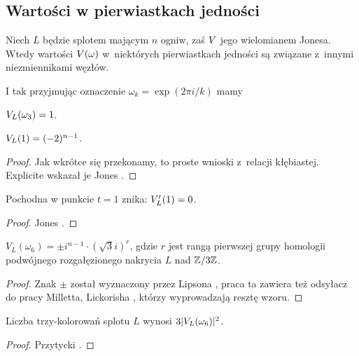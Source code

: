 
\subsection{Wartości w pierwiastkach jedności}
Niech $L$ będzie splotem mającym $n$ ogniw, zaś $V$ jego wielomianem Jonesa.
Wtedy wartości $V(\omega)$ w~niektórych pierwiastkach jedności są związane z~innymi niezmiennikami węzłów.

I tak przyjmując oznaczenie $\omega_k = \exp(2\pi i/k)$ mamy

\begin{proposition}
    \label{prp:jones_at_roots_of_unity}
    $V_L(\omega_3) = 1$.
\end{proposition}

\begin{proposition}
    $V_L(1) = (-2)^{n-1}$.
\end{proposition}

\begin{proof}
%
    Jak wkrótce się przekonamy, to proste wnioski z~relacji kłębiastej.
    Explicite wskazał je Jones \cite[twierdzenie 14, 15]{jones1985}.
\end{proof}

\begin{proposition}
    Pochodna w punkcie $t = 1$ znika: $V'_L(1) = 0$.
\end{proposition}

\begin{proof}
    Jones \cite[twierdzenie 16]{jones1985}.
\end{proof}

\begin{proposition}
    $V_L(\omega_6) = \pm i^{n-1} \cdot (\sqrt 3i)^r$, gdzie $r$ jest rangą pierwszej grupy homologii podwójnego rozgałęzionego nakrycia $L$ nad $\mathbb Z/3\mathbb Z$.
\end{proposition}

\begin{proof}
%
    Znak $\pm$ został wyznaczony przez Lipsona \cite{lipson1986}, praca ta zawiera też odsyłacz do pracy Milletta, Lickorisha \cite{lickorish1986}, którzy wyprowadzają resztę wzoru.
\end{proof}

\begin{proposition}
    Liczba trzy-kolorowań splotu $L$ wynosi $3|V_L(\omega_6)|^2$.
\end{proposition}

\begin{proof}
%
    Przytycki \cite{przytycki1998}.
\end{proof}

